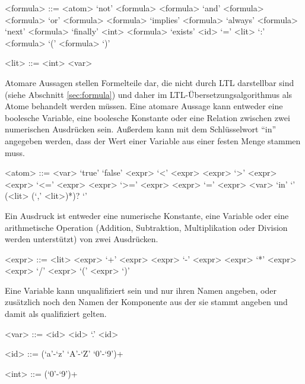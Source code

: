 \begin{grammar}
  <formula> ::= <atom>
  \alt `not' <formula>
  \alt <formula> `and' <formula>
  \alt <formula> `or' <formula>
  \alt <formula> `implies' <formula>
  \alt `always' <formula>
  \alt `next' <formula>
  \alt `finally' <int> <formula>
  \alt `exists' <id> `=' <lit> `:' <formula>
  \alt `(' <formula> `)'
  
  <lit> ::= <int>
  \alt <var>
\end{grammar}
Atomare Aussagen stellen Formelteile dar, die nicht durch LTL darstellbar sind (siehe Abschnitt \ref{sec:formula}) und daher im LTL-Übersetzungsalgorithmus als Atome behandelt werden müssen.
Eine atomare Aussage kann entweder eine boolesche Variable, eine boolesche Konstante oder eine Relation zwischen zwei numerischen Ausdrücken sein.
Außerdem kann mit dem Schlüsselwort "`in"' angegeben werden, dass der Wert einer Variable aus einer festen Menge stammen muss.
\begin{grammar}
  <atom> ::= <var>
  \alt `true'
  \alt `false'
  \alt <expr> `<' <expr>
  \alt <expr> `>' <expr>
  \alt <expr> `<=' <expr>
  \alt <expr> `>=' <expr>
  \alt <expr> `=' <expr>
  \alt <var> `in' `{' (<lit> (`,' <lit>)*)? `}'
\end{grammar}
Ein Ausdruck ist entweder eine numerische Konstante, eine Variable oder eine arithmetische Operation (Addition, Subtraktion, Multiplikation oder Division werden unterstützt) von zwei Ausdrücken.
\begin{grammar}
  <expr> ::= <lit>
  \alt <expr> `+' <expr>
  \alt <expr> `-' <expr>
  \alt <expr> `*' <expr>
  \alt <expr> `/' <expr>
  \alt `(' <expr> `)'
\end{grammar}
Eine Variable kann unqualifiziert sein und nur ihren Namen angeben, oder zusätzlich noch den Namen der Komponente aus der sie stammt angeben und damit als qualifiziert gelten.
\begin{grammar}  
  <var> ::= <id>
  \alt <id> `.' <id>
  
  <id> ::= (`a'-`z' `A'-`Z' `0'-`9')+
  
  <int> ::= (`0'-`9')+
\end{grammar}
